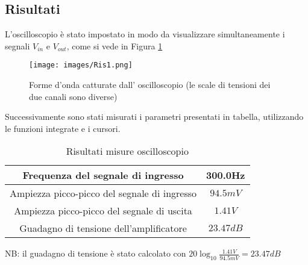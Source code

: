 \subsection{Risultati}
L'oscilloscopio è stato impostato in modo da visualizzare simultaneamente i segnali $V_{in}$ e $V_{out}$, come si vede in Figura \ref{fig:Ris1}
\begin{figure}[H]
    \centering
    \texttt{[image: images/Ris1.png]}
    \caption{Forme d'onda catturate dall' oscilloscopio (le scale di tensioni dei due canali sono diverse)}
    \label{fig:Ris1}
\end{figure}
Successivamente sono stati misurati i parametri presentati in tabella, utilizzando le funzioni integrate e i cursori.
\begin{table}[H]
    \centering
    \begin{tabular}{|c|c|}
        \hline
        Frequenza del segnale di ingresso & 300.0Hz \\\hline
        Ampiezza picco-picco del segnale di ingresso &  $94.5mV$ \\\hline
        Ampiezza picco-picco del segnale di uscita & $1.41V$ \\\hline
        Guadagno di tensione dell'amplificatore & $23.47dB$
        \\\hline
    \end{tabular}
    \caption{Risultati misure oscilloscopio}
    \label{tab:Ris1}
\end{table}
NB: il guadagno di tensione è stato calcolato con $20\log_{10}{\frac{1.41V}{94.5mV}}=23.47dB$
